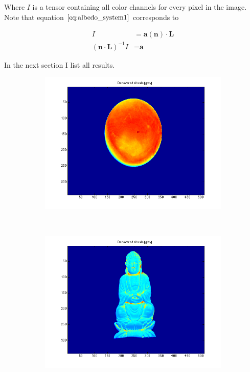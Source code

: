 \documentclass{paper}
\begin{document}
Where $I$ is a tensor containing all color channels for every pixel in the image.
Note that equation $\ref{eq:albedo_system1}$ corresponds to 

\begin{align}
    I &= \textbf{a}(\textbf{n}) \cdot \textbf{L} \nonumber \\
    (\textbf{n} \cdot \textbf{L})^{-1}I &= \textbf{a}
\label{eq:albedo_system2}
\end{align}

In the next section I list all results.

\begin{figure}[h!]
    \centering
    \begin{subfigure}{0.3\textwidth}
        \includegraphics[width=\textwidth]{results/gray/gray_rec_a}
    \end{subfigure}
    ~
    \begin{subfigure}{0.3\textwidth}
        \includegraphics[width=\textwidth]{results/buddha/buddha_rec_a}

\end{subfigure}
\end{figure}
\end{document}
